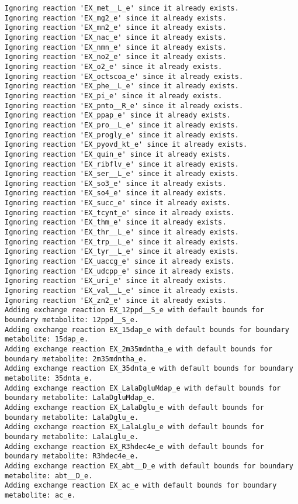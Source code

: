 \documentclass[
  letterpaper,
  DIV=11,
  numbers=noendperiod]{scrartcl}
\begin{document}
\begin{verbatim}
Ignoring reaction 'EX_met__L_e' since it already exists.
Ignoring reaction 'EX_mg2_e' since it already exists.
Ignoring reaction 'EX_mn2_e' since it already exists.
Ignoring reaction 'EX_nac_e' since it already exists.
Ignoring reaction 'EX_nmn_e' since it already exists.
Ignoring reaction 'EX_no2_e' since it already exists.
Ignoring reaction 'EX_o2_e' since it already exists.
Ignoring reaction 'EX_octscoa_e' since it already exists.
Ignoring reaction 'EX_phe__L_e' since it already exists.
Ignoring reaction 'EX_pi_e' since it already exists.
Ignoring reaction 'EX_pnto__R_e' since it already exists.
Ignoring reaction 'EX_ppap_e' since it already exists.
Ignoring reaction 'EX_pro__L_e' since it already exists.
Ignoring reaction 'EX_progly_e' since it already exists.
Ignoring reaction 'EX_pyovd_kt_e' since it already exists.
Ignoring reaction 'EX_quin_e' since it already exists.
Ignoring reaction 'EX_ribflv_e' since it already exists.
Ignoring reaction 'EX_ser__L_e' since it already exists.
Ignoring reaction 'EX_so3_e' since it already exists.
Ignoring reaction 'EX_so4_e' since it already exists.
Ignoring reaction 'EX_succ_e' since it already exists.
Ignoring reaction 'EX_tcynt_e' since it already exists.
Ignoring reaction 'EX_thm_e' since it already exists.
Ignoring reaction 'EX_thr__L_e' since it already exists.
Ignoring reaction 'EX_trp__L_e' since it already exists.
Ignoring reaction 'EX_tyr__L_e' since it already exists.
Ignoring reaction 'EX_uaccg_e' since it already exists.
Ignoring reaction 'EX_udcpp_e' since it already exists.
Ignoring reaction 'EX_uri_e' since it already exists.
Ignoring reaction 'EX_val__L_e' since it already exists.
Ignoring reaction 'EX_zn2_e' since it already exists.
Adding exchange reaction EX_12ppd__S_e with default bounds for boundary metabolite: 12ppd__S_e.
Adding exchange reaction EX_15dap_e with default bounds for boundary metabolite: 15dap_e.
Adding exchange reaction EX_2m35mdntha_e with default bounds for boundary metabolite: 2m35mdntha_e.
Adding exchange reaction EX_35dnta_e with default bounds for boundary metabolite: 35dnta_e.
Adding exchange reaction EX_LalaDgluMdap_e with default bounds for boundary metabolite: LalaDgluMdap_e.
Adding exchange reaction EX_LalaDglu_e with default bounds for boundary metabolite: LalaDglu_e.
Adding exchange reaction EX_LalaLglu_e with default bounds for boundary metabolite: LalaLglu_e.
Adding exchange reaction EX_R3hdec4e_e with default bounds for boundary metabolite: R3hdec4e_e.
Adding exchange reaction EX_abt__D_e with default bounds for boundary metabolite: abt__D_e.
Adding exchange reaction EX_ac_e with default bounds for boundary metabolite: ac_e.

\end{verbatim}
\end{document}
